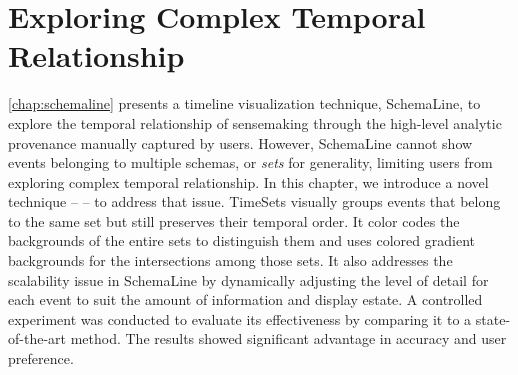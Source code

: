 \chapter{Exploring Complex Temporal Relationship}
\label{chap:timesets}

\graphicspath{{Chapter4/figures/}}

\autoref{chap:schemaline} presents a timeline visualization technique, SchemaLine, to explore the temporal relationship of sensemaking through the high-level analytic provenance manually captured by users. However, SchemaLine cannot show events belonging to multiple schemas, or \emph{sets} for generality, limiting users from exploring complex temporal relationship. In this chapter, we introduce a novel technique -- \emph{} -- to address that issue. TimeSets visually groups events that belong to the same set but still preserves their temporal order. It color codes the backgrounds of the entire sets to distinguish them and uses colored gradient backgrounds for the intersections among those sets. It also addresses the scalability issue in SchemaLine by dynamically adjusting the level of detail for each event to suit the amount of information and display estate. A controlled experiment was conducted to evaluate its effectiveness by comparing it to a state-of-the-art method. The results showed significant advantage in accuracy and user preference.










